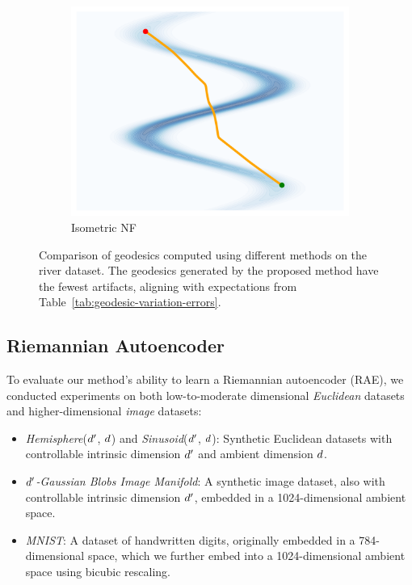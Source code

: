 \begin{figure}[htbp]
\begin{subfigure}[b]{0.18\textwidth}
        \includegraphics[width=\textwidth]{chapter5/results/visualisations/geodesics/isometricNF.png}
        \caption{\scriptsize Isometric NF}
        \end{subfigure}
        \caption{Comparison of geodesics computed using different methods on the river dataset. The geodesics generated by the proposed method have the fewest artifacts, aligning with expectations from Table~\ref{tab:geodesic-variation-errors}.}
        \label{fig:geodesics_comparison}
    \end{figure}
    

\subsection{Riemannian Autoencoder}\label{sec:RAE-experiments}
    
    To evaluate our method’s ability to learn a Riemannian autoencoder (RAE), we conducted experiments on both low-to-moderate dimensional \emph{Euclidean} datasets and higher-dimensional \emph{image} datasets:

    \begin{itemize}
        \item \textit{Hemisphere}($d'$, $d$) and \textit{Sinusoid}($d'$, $d$): Synthetic Euclidean datasets with controllable intrinsic dimension $d'$ and ambient dimension $d$.
        \item \(d'\)\emph{-Gaussian Blobs Image Manifold}: A synthetic image dataset, also with controllable intrinsic dimension $d'$, embedded in a 1024-dimensional ambient space.
        \item \textit{MNIST}: A dataset of handwritten digits, originally embedded in a 784-dimensional space, which we further embed into a 1024-dimensional ambient space using bicubic rescaling.
    \end{itemize}

